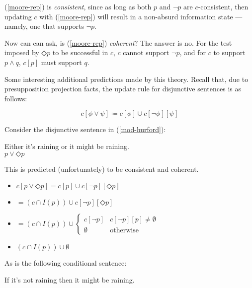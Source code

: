 \documentclass[nols,twoside,nofonts,nobib,nohyper]{tufte-handout}
\theoremstyle{definition}
\begin{document}
(\ref{moore-rep}) is \textit{consistent}, since as long as both $p$ and $¬ p$ are $c$-consistent, then updating $c$ with (\ref{moore-rep}) will result in a non-absurd information state --- namely, one that supports $¬ p$.

Now can can ask, is (\ref{moore-rep}) \textit{coherent}? The answer is no. For the test imposed by $◇ p$ to be successful in $c$, $c$ cannot support $¬ p$, and for $c$ to support $p ∧ q$, $c[p]$ must support $q$.

Some interesting additional predictions made by this theory. Recall that, due to presupposition projection facts, the update rule for disjunctive sentences is as follows:

$$
c[ϕ ∨ ψ] ≔ c[ϕ] ∪ c[¬ ϕ][ψ]
$$

Consider the disjunctive sentence in (\ref{mod-hurford}):

\ex
Either it's raining or it might be raining.\\
$p ∨ ◇ p$\label{mod-hurford}
\xe

This is predicted (unfortunately) to be consistent and coherent.

\begin{itemize}
    \item $c[p ∨ ◇ p] = c[p] ∪ c[¬ p][◇ p]$
    \item $= (c ∩ I(p)) ∪ c[¬ p][◇ p]$
  \item $= (c ∩ I(p)) ∪ \begin{cases}
    c[¬ p]&c[¬ p][p] ≠ ∅\\
    ∅&\text{otherwise}
    \end{cases}$
  \item $(c ∩ I(p)) ∪ ∅$
\end{itemize}

As is the following conditional sentence:

\ex
If it's not raining then it might be raining.
\xe


\printbibliography
\end{document}
